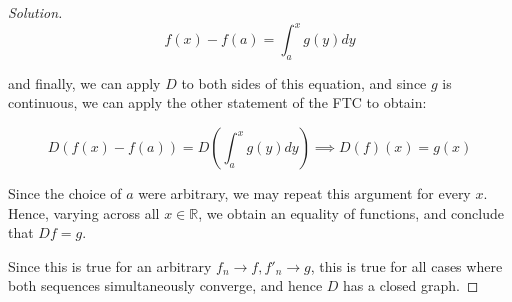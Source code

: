 \documentclass[10pt]{article}
\begin{document}
\begin{proof}[Solution]
$$ f(x)  - f(a) = \int_a^x g(y) dy$$

and finally, we can apply $D$ to both sides of this equation, and since $g$ is continuous, we can apply the other statement of the FTC to obtain:

$$ D(f(x) - f(a)) = D\left(\int_a^x g(y) dy \right) \implies D(f)(x) = g(x) $$

Since the choice of $a$ were arbitrary, we may repeat this argument for every $x$. Hence, varying across all $x \in \mathbb{R}$, we obtain an equality of functions, and conclude that $Df = g$.

Since this is true for an arbitrary $f_n \to f, f'_n \to g$, this is true for all cases where both sequences simultaneously converge, and hence $D$ has a closed graph.

\end{proof}
\end{document}
